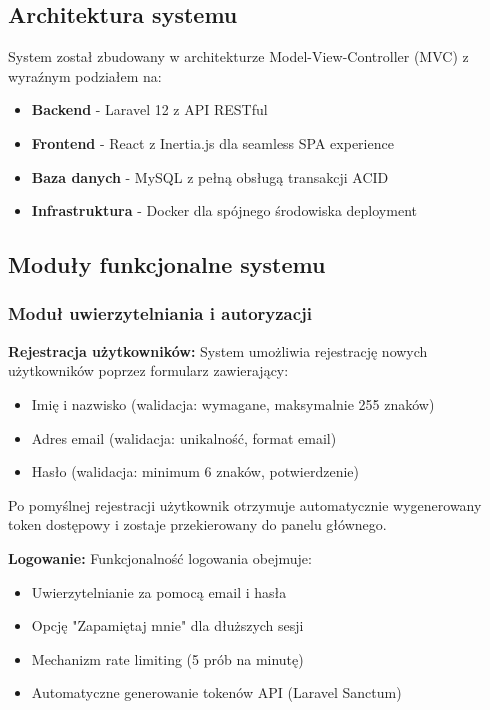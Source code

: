 \documentclass[12pt,a4paper]{article}
\begin{document}
    \subsection{Architektura systemu}

    System został zbudowany w architekturze Model-View-Controller (MVC) z wyraźnym podziałem na:
    \begin{itemize}
        \item \textbf{Backend} - Laravel 12 z API RESTful
        \item \textbf{Frontend} - React z Inertia.js dla seamless SPA experience
        \item \textbf{Baza danych} - MySQL z pełną obsługą transakcji ACID
        \item \textbf{Infrastruktura} - Docker dla spójnego środowiska deployment
    \end{itemize}

    \subsection{Moduły funkcjonalne systemu}

    \subsubsection{Moduł uwierzytelniania i autoryzacji}

    \textbf{Rejestracja użytkowników:}
    System umożliwia rejestrację nowych użytkowników poprzez formularz zawierający:
    \begin{itemize}
        \item Imię i nazwisko (walidacja: wymagane, maksymalnie 255 znaków)
        \item Adres email (walidacja: unikalność, format email)
        \item Hasło (walidacja: minimum 6 znaków, potwierdzenie)
    \end{itemize}

    Po pomyślnej rejestracji użytkownik otrzymuje automatycznie wygenerowany token dostępowy i zostaje przekierowany do panelu głównego.

    \textbf{Logowanie:}
    Funkcjonalność logowania obejmuje:
    \begin{itemize}
        \item Uwierzytelnianie za pomocą email i hasła
        \item Opcję "Zapamiętaj mnie" dla dłuższych sesji
        \item Mechanizm rate limiting (5 prób na minutę)
        \item Automatyczne generowanie tokenów API (Laravel Sanctum)
    \end{itemize}
\end{document}
